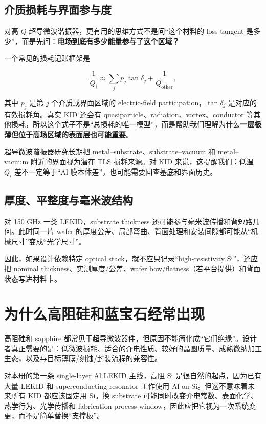 \subsection{介质损耗与界面参与度}

对高 $Q$ 超导微波谐振器，更有用的思维方式不是问“这个材料的 loss tangent 是多少”，而是先问：\textbf{电场到底有多少能量参与了这个区域？}

一个常见的损耗记账框架是

\[
\frac{1}{Q_i}\approx \sum_j p_j\tan\delta_j + \frac{1}{Q_{\mathrm{other}}},
\]

其中 $p_j$ 是第 $j$ 个介质或界面区域的 electric-field participation，$\tan\delta_j$ 是对应的有效损耗角。真实 KID 还会有 quasiparticle、radiation、vortex、conductor 等其他损耗，所以这个式子不是“总损耗的唯一模型”，而是帮助我们理解为什么\textbf{一层极薄但位于高场区域的表面层也可能重要}。

超导微波谐振器研究长期把 metal--substrate、substrate--vacuum 和 metal--vacuum 附近的界面视为潜在 TLS 损耗来源。对 KID 来说，这提醒我们：低温 $Q_i$ 差不一定等于“Al 膜本体差”，也可能需要回查基底和界面历史。

\subsection{厚度、平整度与毫米波结构}

对 150 GHz 一类 LEKID，substrate thickness 还可能参与毫米波传播和背短路几何。此时同一片 wafer 的厚度公差、局部弯曲、背面处理和安装间隙都可能从“机械尺寸”变成“光学尺寸”。

因此，如果设计依赖特定 optical stack，就不应只记录“high-resistivity Si”，还应把 nominal thickness、实测厚度/公差、wafer bow/flatness（若平台提供）和背面状态写进材料卡。

\section{为什么高阻硅和蓝宝石经常出现}

高阻硅和 sapphire 都常见于超导微波器件，但原因不能简化成“它们绝缘”。设计者真正需要的是：低微波损耗、适合的介电性质、较好的晶圆质量、成熟微纳加工生态，以及与目标薄膜/刻蚀/封装流程的兼容性。

对本册的第一条 single-layer Al LEKID 主线，高阻 Si 是很自然的起点，因为已有大量 LEKID 和 superconducting resonator 工作使用 Al-on-Si。但这不意味着未来所有 KID 都应该固定用 Si。换 substrate 可能同时改变介电常数、表面化学、热学行为、光学传播和 fabrication process window，因此应把它视为一次系统变更，而不是简单替换“支撑板”。


